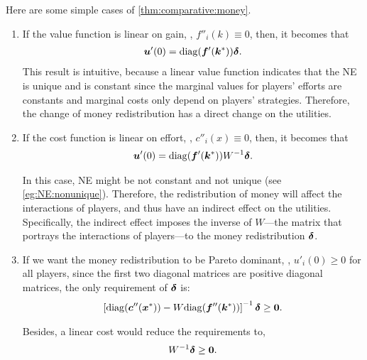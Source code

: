 \begin{example}
\label{eg:comparative:money:simple}
Here are some simple cases of \cref{thm:comparative:money}.
\begin{enumerate}
\item If the value function is linear on gain, \ie, $f''_i(k) \equiv 0$, then, it becomes that
\begin{align*}
    {\bm{u}}'(0) = \mathrm{diag}({\bm{f}}'({\bm{k}}^*)) \bm{\delta}.
\end{align*}
This result is intuitive, because a linear value function indicates that the NE is unique and is constant since the marginal values for players' efforts are constants and marginal costs only depend on players' strategies. Therefore, the change of money redistribution has a direct change on the utilities.

\item If the cost function is linear on effort, \ie, $c''_i(x) \equiv 0$, then, it becomes that
\begin{align*}
    {\bm{u}}'(0) = \mathrm{diag}({\bm{f}}'({\bm{k}}^*)) W^{-1} \bm{\delta}.
\end{align*}

In this case, NE might be not constant and not unique (see \cref{eg:NE:nonunique}). Therefore, the redistribution of money will affect the interactions of players, and thus have an indirect effect on the utilities. Specifically, the indirect effect imposes the inverse of $W$---the matrix that portrays the interactions of players---to the money redistribution $\bm{\delta}$.

\item If we want the money redistribution to be Pareto dominant, \ie, $u'_i(0) \ge 0$ for all players, since the first two diagonal matrices are positive diagonal matrices, the only requirement of $\bm{\delta}$ is:
\begin{align*}
    \left[ \mathrm{diag}({\bm{c}}''({\bm{x}}^*)) - W \mathrm{diag}({\bm{f}}''({\bm{k}}^*)) \right]^{-1} \bm{\delta} \ge \mathbf{0}.
\end{align*}

Besides, a linear cost would reduce the requirements to,
\begin{align*}
    W^{-1}\bm{\delta} \ge \mathbf{0}.
\end{align*}

\end{enumerate}

\end{example}